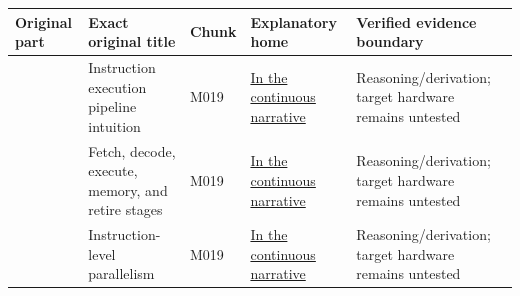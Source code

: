 {\def\LTcaptype{none} %
\begin{longtable}[]{@{}
  >{\raggedleft\arraybackslash}p{}
  >{\raggedright\arraybackslash}p{}
  >{\raggedright\arraybackslash}p{}
  >{\raggedright\arraybackslash}p{}
  >{\raggedright\arraybackslash}p{}@{}}
\toprule\noalign{}
\begin{minipage}[b]{\linewidth}\raggedleft
Original part
\end{minipage} & \begin{minipage}[b]{\linewidth}\raggedright
Exact original title
\end{minipage} & \begin{minipage}[b]{\linewidth}\raggedright
Chunk
\end{minipage} & \begin{minipage}[b]{\linewidth}\raggedright
Explanatory home
\end{minipage} & \begin{minipage}[b]{\linewidth}\raggedright
Verified evidence boundary
\end{minipage} \\
\midrule\noalign{}
\endhead
\bottomrule\noalign{}
\endlastfoot
301 & Instruction execution pipeline intuition & M019 & \href{Continuous\%20Notes/Computing\%20Foundations\%20-\%20From\%20Bits\%20to\%20C++\%20and\%20Systems\%20APIs\#Why\%20a\%20five-stage\%20pipeline\%20is\%20an\%20explanation,\%20not\%20a\%20prediction\%20of\%20modern\%20silicon/}{In the continuous narrative} & Reasoning/derivation; target hardware remains untested \\
302 & Fetch, decode, execute, memory, and retire stages & M019 & \href{Continuous\%20Notes/Computing\%20Foundations\%20-\%20From\%20Bits\%20to\%20C++\%20and\%20Systems\%20APIs\#Why\%20a\%20five-stage\%20pipeline\%20is\%20an\%20explanation,\%20not\%20a\%20prediction\%20of\%20modern\%20silicon/}{In the continuous narrative} & Reasoning/derivation; target hardware remains untested \\
303 & Instruction-level parallelism & M019 & \href{Continuous\%20Notes/Computing\%20Foundations\%20-\%20From\%20Bits\%20to\%20C++\%20and\%20Systems\%20APIs\#Why\%20a\%20five-stage\%20pipeline\%20is\%20an\%20explanation,\%20not\%20a\%20prediction\%20of\%20modern\%20silicon/}{In the continuous narrative} & Reasoning/derivation; target hardware remains untested \\

\end{longtable}}
